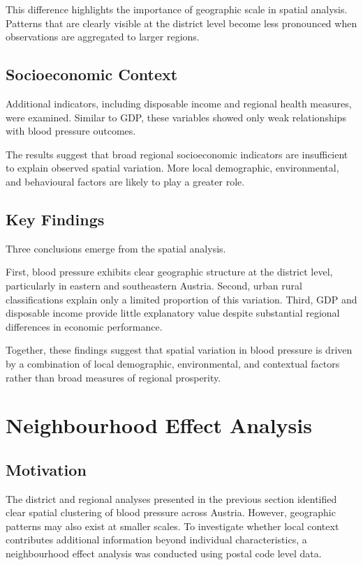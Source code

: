 \documentclass[12pt,a4paper]{article}
\begin{document}
This difference highlights the importance of geographic scale in spatial analysis. Patterns that are clearly visible at the district level become less pronounced when observations are aggregated to larger regions.

\subsection{Socioeconomic Context}

Additional indicators, including disposable income and regional health measures, were examined. Similar to GDP, these variables showed only weak relationships with blood pressure outcomes.

The results suggest that broad regional socioeconomic indicators are insufficient to explain observed spatial variation. More local demographic, environmental, and behavioural factors are likely to play a greater role.

\subsection{Key Findings}

Three conclusions emerge from the spatial analysis.

First, blood pressure exhibits clear geographic structure at the district level, particularly in eastern and southeastern Austria. Second, urban rural classifications explain only a limited proportion of this variation. Third, GDP and disposable income provide little explanatory value despite substantial regional differences in economic performance.

Together, these findings suggest that spatial variation in blood pressure is driven by a combination of local demographic, environmental, and contextual factors rather than broad measures of regional prosperity.
\section{Neighbourhood Effect Analysis}

\subsection{Motivation}

The district and regional analyses presented in the previous section identified clear spatial clustering of blood pressure across Austria. However, geographic patterns may also exist at smaller scales. To investigate whether local context contributes additional information beyond individual characteristics, a neighbourhood effect analysis was conducted using postal code level data.
\end{document}
